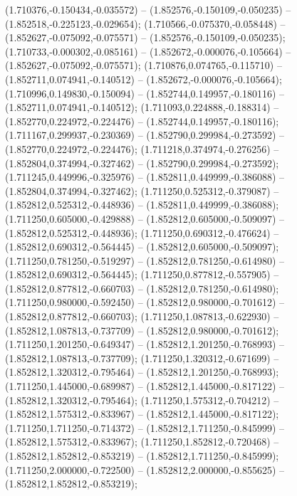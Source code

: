  (1.710376,-0.150434,-0.035572) -- (1.852576,-0.150109,-0.050235) -- (1.852518,-0.225123,-0.029654);
 (1.710566,-0.075370,-0.058448) -- (1.852627,-0.075092,-0.075571) -- (1.852576,-0.150109,-0.050235);
 (1.710733,-0.000302,-0.085161) -- (1.852672,-0.000076,-0.105664) -- (1.852627,-0.075092,-0.075571);
 (1.710876,0.074765,-0.115710) -- (1.852711,0.074941,-0.140512) -- (1.852672,-0.000076,-0.105664);
 (1.710996,0.149830,-0.150094) -- (1.852744,0.149957,-0.180116) -- (1.852711,0.074941,-0.140512);
 (1.711093,0.224888,-0.188314) -- (1.852770,0.224972,-0.224476) -- (1.852744,0.149957,-0.180116);
 (1.711167,0.299937,-0.230369) -- (1.852790,0.299984,-0.273592) -- (1.852770,0.224972,-0.224476);
 (1.711218,0.374974,-0.276256) -- (1.852804,0.374994,-0.327462) -- (1.852790,0.299984,-0.273592);
 (1.711245,0.449996,-0.325976) -- (1.852811,0.449999,-0.386088) -- (1.852804,0.374994,-0.327462);
 (1.711250,0.525312,-0.379087) -- (1.852812,0.525312,-0.448936) -- (1.852811,0.449999,-0.386088);
 (1.711250,0.605000,-0.429888) -- (1.852812,0.605000,-0.509097) -- (1.852812,0.525312,-0.448936);
 (1.711250,0.690312,-0.476624) -- (1.852812,0.690312,-0.564445) -- (1.852812,0.605000,-0.509097);
 (1.711250,0.781250,-0.519297) -- (1.852812,0.781250,-0.614980) -- (1.852812,0.690312,-0.564445);
 (1.711250,0.877812,-0.557905) -- (1.852812,0.877812,-0.660703) -- (1.852812,0.781250,-0.614980);
 (1.711250,0.980000,-0.592450) -- (1.852812,0.980000,-0.701612) -- (1.852812,0.877812,-0.660703);
 (1.711250,1.087813,-0.622930) -- (1.852812,1.087813,-0.737709) -- (1.852812,0.980000,-0.701612);
 (1.711250,1.201250,-0.649347) -- (1.852812,1.201250,-0.768993) -- (1.852812,1.087813,-0.737709);
 (1.711250,1.320312,-0.671699) -- (1.852812,1.320312,-0.795464) -- (1.852812,1.201250,-0.768993);
 (1.711250,1.445000,-0.689987) -- (1.852812,1.445000,-0.817122) -- (1.852812,1.320312,-0.795464);
 (1.711250,1.575312,-0.704212) -- (1.852812,1.575312,-0.833967) -- (1.852812,1.445000,-0.817122);
 (1.711250,1.711250,-0.714372) -- (1.852812,1.711250,-0.845999) -- (1.852812,1.575312,-0.833967);
 (1.711250,1.852812,-0.720468) -- (1.852812,1.852812,-0.853219) -- (1.852812,1.711250,-0.845999);
 (1.711250,2.000000,-0.722500) -- (1.852812,2.000000,-0.855625) -- (1.852812,1.852812,-0.853219);
